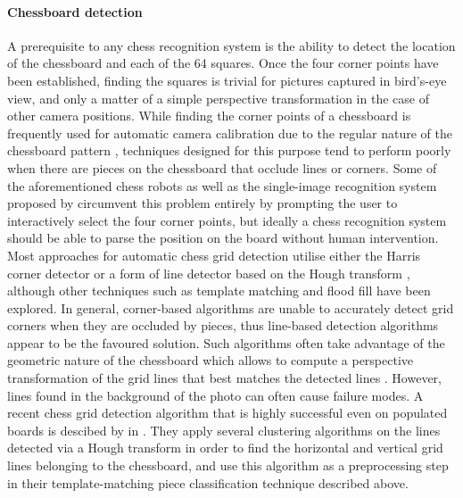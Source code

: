 \documentclass[../../main.tex]{subfiles}
\begin{document}
\paragraph{Chessboard detection}
A prerequisite to any chess recognition system is the ability to detect the location of the chessboard and each of the 64 squares. 
Once the four corner points have been established, finding the squares is trivial for pictures captured in bird's-eye view, and only a matter of a simple perspective transformation in the case of other camera positions.
While finding the corner points of a chessboard is frequently used for automatic camera calibration due to the regular nature of the chessboard pattern \cite{delaescalera2010,bennett2014}, techniques designed for this purpose tend to perform poorly when there are pieces on the chessboard that occlude lines or corners.
Some of the aforementioned chess robots \cite{goncalves2005,sokic2008,khan2014} as well as the single-image recognition system proposed by \textcite{danner2015} circumvent this problem entirely by prompting the user to interactively select the four corner points, but ideally a chess recognition system should be able to parse the position on the board without human intervention.
Most approaches for automatic chess grid detection utilise either the Harris corner detector \cite{banerjee2012,hack2014} or a form of line detector based on the Hough transform \cite{tam2008,neufeld2010,danner2015,chen2016,kanchibail2016,xie2018a,chen2019}, although other techniques such as template matching \cite{matuszek2011} and flood fill \cite{wang2013} have been explored.
In general, corner-based algorithms are unable to accurately detect grid corners when they are occluded by pieces, thus line-based detection algorithms appear to be the favoured solution.
Such algorithms often take advantage of the geometric nature of the chessboard which allows to compute a perspective transformation of the grid lines that best matches the detected lines \cite{tam2008,hack2014,xie2018}.
However, lines found in the background of the photo can often cause failure modes.
A recent chess grid detection algorithm that is highly successful even on populated boards is descibed by \citeauthor{xie2018a} in \cite{xie2018a}. 
They apply several clustering algorithms on the lines detected via a Hough transform in order to find the horizontal and vertical grid lines belonging to the chessboard, and use this algorithm as a preprocessing step in their template-matching piece classification technique \cite{xie2018} described above. 
\end{document}
